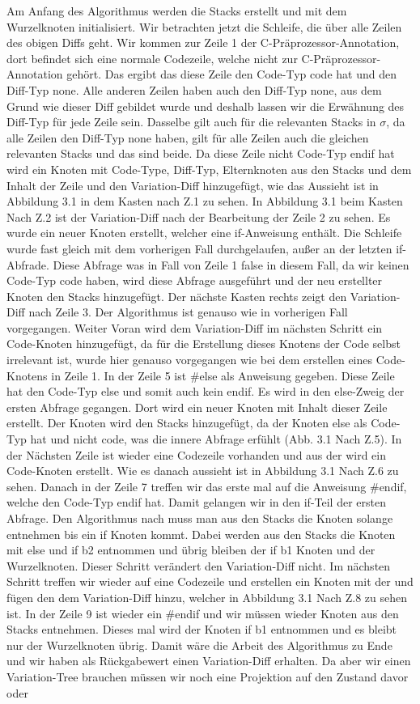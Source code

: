 Am Anfang des Algorithmus werden die Stacks erstellt und mit dem Wurzelknoten  initialisiert. Wir betrachten jetzt die Schleife, die über alle Zeilen des obigen Diffs geht. Wir kommen zur Zeile 1 der C-Präprozessor-Annotation, dort befindet sich eine normale Codezeile, welche nicht zur C-Präprozessor-Annotation gehört. Das ergibt das diese Zeile den Code-Typ code hat und den Diff-Typ none. Alle anderen Zeilen haben auch den Diff-Typ none, aus dem Grund wie dieser Diff gebildet wurde und deshalb lassen wir die Erwähnung des Diff-Typ für jede Zeile sein. Dasselbe gilt auch für die relevanten Stacks in $\sigma$, da alle Zeilen den Diff-Typ none haben, gilt für alle Zeilen auch die gleichen relevanten Stacks und das sind beide. Da diese Zeile nicht Code-Typ endif hat wird ein Knoten mit Code-Type, Diff-Typ, Elternknoten aus den Stacks und dem Inhalt der Zeile und den Variation-Diff hinzugefügt, wie das Aussieht ist in Abbildung 3.1 in dem Kasten nach Z.1 zu sehen. In Abbildung 3.1 beim Kasten Nach Z.2 ist der Variation-Diff nach der Bearbeitung der Zeile 2 zu sehen. Es wurde ein neuer Knoten erstellt, welcher eine if-Anweisung enthält. Die Schleife wurde fast gleich mit dem vorherigen Fall durchgelaufen, außer an der letzten if-Abfrade. Diese Abfrage was in Fall von Zeile 1 false in diesem Fall, da wir keinen Code-Typ code haben, wird diese Abfrage ausgeführt und der neu erstellter Knoten den Stacks hinzugefügt. Der nächste Kasten rechts zeigt den Variation-Diff nach Zeile 3. Der Algorithmus ist genauso wie in vorherigen Fall vorgegangen. Weiter Voran wird dem Variation-Diff im nächsten Schritt ein Code-Knoten hinzugefügt, da für die Erstellung dieses Knotens der Code selbst irrelevant ist, wurde hier genauso vorgegangen wie bei dem erstellen eines Code-Knotens in Zeile 1. In der Zeile 5 ist \#else als Anweisung gegeben. Diese Zeile hat den Code-Typ else und somit auch kein endif. Es wird in den else-Zweig der ersten Abfrage gegangen. Dort wird ein neuer Knoten mit Inhalt dieser Zeile erstellt. Der Knoten wird den Stacks hinzugefügt, da der Knoten else  als Code-Typ hat und nicht code, was die innere Abfrage erfühlt (Abb. 3.1 Nach Z.5). In der Nächsten Zeile ist wieder eine Codezeile vorhanden und aus der wird ein Code-Knoten erstellt. Wie es danach aussieht ist in Abbildung 3.1 Nach Z.6 zu sehen. Danach in der Zeile 7 treffen wir das erste mal auf die Anweisung \#endif, welche den Code-Typ endif hat. Damit gelangen wir in den if-Teil der ersten Abfrage. Den Algorithmus nach muss man aus den Stacks die Knoten solange entnehmen bis ein if Knoten kommt. Dabei werden aus den Stacks die Knoten mit else und if b2 entnommen und übrig bleiben der if b1 Knoten und der Wurzelknoten. Dieser Schritt verändert den Variation-Diff nicht. Im nächsten Schritt treffen wir wieder auf eine Codezeile und erstellen ein Knoten mit der und fügen den dem Variation-Diff hinzu, welcher in Abbildung 3.1 Nach Z.8 zu sehen ist. In der Zeile 9 ist wieder ein \#endif und wir müssen wieder Knoten aus den Stacks entnehmen. Dieses mal wird der Knoten if b1 entnommen und es bleibt nur der Wurzelknoten übrig. Damit wäre die Arbeit des Algorithmus zu Ende und wir haben als Rückgabewert einen Variation-Diff erhalten. Da aber wir einen Variation-Tree brauchen müssen wir noch eine Projektion auf den Zustand davor oder 